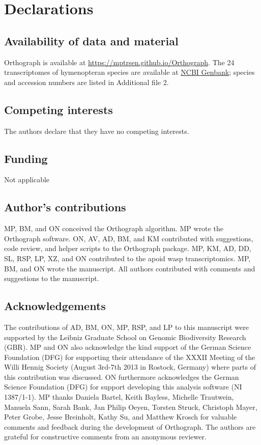 \section{Declarations}

\subsection{Availability of data and material}

Orthograph is available at \url{https://mptrsen.github.io/Orthograph}.
The 24 transcriptomes of hymenopteran species are available at
\href{http://www.ncbi.nlm.nih.gov/bioproject/?term=PRJNA183205}{NCBI
Genbank}; species and accession numbers are listed in Additional file 2.

\subsection{Competing interests}

The authors declare that they have no competing interests.

\subsection{Funding}

Not applicable

\subsection{Author's contributions}

MP, BM, and ON conceived the Orthograph algorithm. MP wrote the
Orthograph software. ON, AV, AD, BM, and KM contributed with
suggestions, code review, and helper scripts to the Orthograph package.
MP, KM, AD, DD, SL, RSP, LP, XZ, and ON contributed to the apoid wasp
transcriptomics. MP, BM, and ON wrote the manuscript. All authors
contributed with comments and suggestions to the manuscript.

\subsection{Acknowledgements}

The contributions of AD, BM, ON, MP, RSP, and LP to this manuscript were
supported by the Leibniz Graduate School on Genomic Biodiversity
Research (GBR).  MP and ON also acknowledge the kind support of the
German Science Foundation (DFG) for supporting their attendance of the
XXXII Meeting of the Willi Hennig Society (August 3rd-7th 2013 in
Rostock, Germany) where parts of this contribution was discussed.  ON
furthermore acknowledges the German Science Foundation (DFG) for support
developing this analysis software (NI 1387/1-1).  MP thanks Daniela
Bartel, Keith Bayless, Michelle Trautwein, Manuela Sann, Sarah Bank, Jan
Philip Oeyen, Torsten Struck, Christoph Mayer, Peter Grobe, Jesse
Breinholt, Kathy Su, and Matthew Krosch for valuable comments and
feedback during the development of Orthograph.  The authors are grateful
for constructive comments from an anonymous reviewer.
